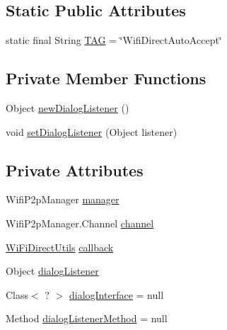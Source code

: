 \subsection*{Static Public Attributes}
\begin{DoxyCompactItemize}
\item 
static final String \hyperlink{classcom_1_1copelabs_1_1oiframework_1_1wifi_1_1_wifi_direct_auto_accept_a846a900891cb89f8bf349d8a72fab581}{T\+A\+G} = \char`\"{}Wifi\+Direct\+Auto\+Accept\char`\"{}
\end{DoxyCompactItemize}
\subsection*{Private Member Functions}
\begin{DoxyCompactItemize}
\item 
Object \hyperlink{classcom_1_1copelabs_1_1oiframework_1_1wifi_1_1_wifi_direct_auto_accept_a084603ad180905878ce6e5689d95d3e3}{new\+Dialog\+Listener} ()
\item 
void \hyperlink{classcom_1_1copelabs_1_1oiframework_1_1wifi_1_1_wifi_direct_auto_accept_ac2aafaa921fd95bdcab867273406fdba}{set\+Dialog\+Listener} (Object listener)
\end{DoxyCompactItemize}
\subsection*{Private Attributes}
\begin{DoxyCompactItemize}
\item 
Wifi\+P2p\+Manager \hyperlink{classcom_1_1copelabs_1_1oiframework_1_1wifi_1_1_wifi_direct_auto_accept_ab03dc3eda0d95b610267cecbc40086ef}{manager}
\item 
Wifi\+P2p\+Manager.\+Channel \hyperlink{classcom_1_1copelabs_1_1oiframework_1_1wifi_1_1_wifi_direct_auto_accept_a0492acbf9bee2fce0ebea454d311acce}{channel}
\item 
\hyperlink{classcom_1_1copelabs_1_1oiframework_1_1wifi_1_1_wi_fi_direct_utils}{Wi\+Fi\+Direct\+Utils} \hyperlink{classcom_1_1copelabs_1_1oiframework_1_1wifi_1_1_wifi_direct_auto_accept_a6aaded0496979f6174fb58fdff3f33dc}{callback}
\item 
Object \hyperlink{classcom_1_1copelabs_1_1oiframework_1_1wifi_1_1_wifi_direct_auto_accept_a2d813798a697868d47996154e4e71648}{dialog\+Listener}
\item 
Class$<$ ? $>$ \hyperlink{classcom_1_1copelabs_1_1oiframework_1_1wifi_1_1_wifi_direct_auto_accept_ae395bcecba68312bb20fafa29a37dac1}{dialog\+Interface} = null
\item 
Method \hyperlink{classcom_1_1copelabs_1_1oiframework_1_1wifi_1_1_wifi_direct_auto_accept_aaeeb4c52dea63fa522b82b9c456a573a}{dialog\+Listener\+Method} = null
\end{DoxyCompactItemize}


